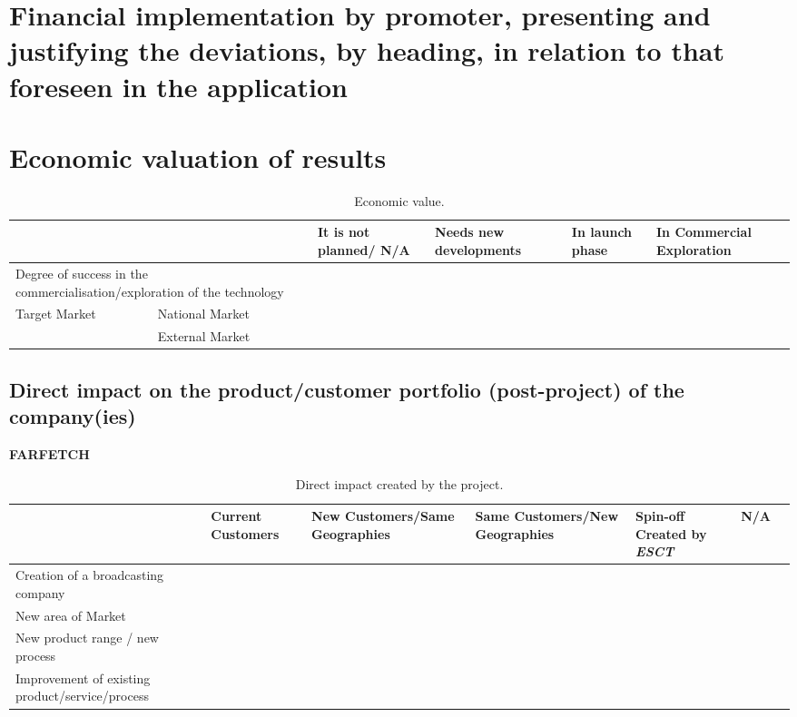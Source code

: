\documentclass{ani-final}
\begin{document}
\cite{sigfridsson}

\chapter{Financial implementation by promoter, presenting and justifying the deviations, by heading, in relation to that foreseen in the application}
\lipsum[30-32]

\chapter{Economic valuation of results}
\begin{table}[!htp]
  \centering
  \scriptsize
  
  \begin{tabular}{ll|p{}p{}p{}p{}}
    \hline\hline
    & & \textbf{It is not planned/ N/A} & \textbf{Needs new developments} & \textbf{In launch phase} & \textbf{In Commercial Exploration}  \\ \hline
    \multicolumn{2}{p{0.4\textwidth}|}{Degree of success in the commercialisation/exploration of the technology} & & & &\\ \hline
    \multirow{2}{*}{Target Market} & National Market & & & & \\ \cline{2-6}
                                   & External Market & & & & \\ \hline
    \hline
  \end{tabular}
  \caption{Economic value.} 
\end{table}

\section{Direct impact on the product/customer portfolio (post-project) of the company(ies)}

\textbf{FARFETCH}

\begin{table}[!htp]
  \centering
  \scriptsize
  
  \begin{tabular}{p{}|p{}p{}p{}p{}p{}p{}}
    \hline\hline
                         & \textbf{Current Customers} & \textbf{New Customers/Same Geographies} & \textbf{Same Customers/New Geographies} & \textbf{Spin-off Created by \emph{ESCT}} & \textbf{N/A}\\ \hline
    Creation of a broadcasting company & & & & &\\ \hline
    New area of Market                 & & & & & \\ \hline
    New product range / new process    & & & & & \\ \hline
    Improvement of existing product/service/process & & & & & \\ \hline
    \hline
  \end{tabular}
  \caption{Direct impact created by the project.} 
\end{table}
\end{document}
